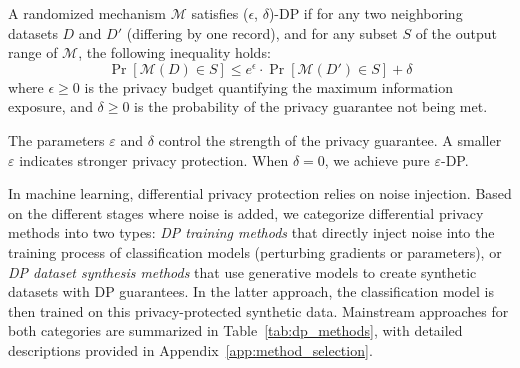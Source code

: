 \documentclass{article}
\begin{document}
\begin{definition}
A randomized mechanism $\mathcal{M}$ satisfies ($\epsilon$, $\delta$)-DP if for any two neighboring datasets $D$ and $D'$ (differing by one record), and for any subset $S$ of the output range of $\mathcal{M}$, the following inequality holds:
$$
\Pr[\mathcal{M}(D) \in S] \leq e^{\epsilon} \cdot \Pr[\mathcal{M}(D') \in S] + \delta
$$
where $\epsilon \geq 0$ is the privacy budget quantifying the maximum information exposure, and $\delta \geq 0$ is the probability of the privacy guarantee not being met.

The parameters $\varepsilon$ and $\delta$ control the strength of the privacy guarantee. A smaller $\varepsilon$ indicates stronger privacy protection. When $\delta = 0$, we achieve pure $\varepsilon$-DP.
\end{definition}

In machine learning, differential privacy protection relies on noise injection. Based on the different stages where noise is added, we categorize differential privacy methods into two types: \textit{DP training methods} that directly inject noise into the training process of classification models (perturbing gradients or parameters), or \textit{DP dataset synthesis methods} that use generative models to create synthetic datasets with DP guarantees. In the latter approach, the classification model is then trained on this privacy-protected synthetic data. Mainstream approaches for both categories are summarized in Table~\ref{tab:dp_methods}, with detailed descriptions provided in Appendix~\ref{app:method_selection}.
\end{document}
